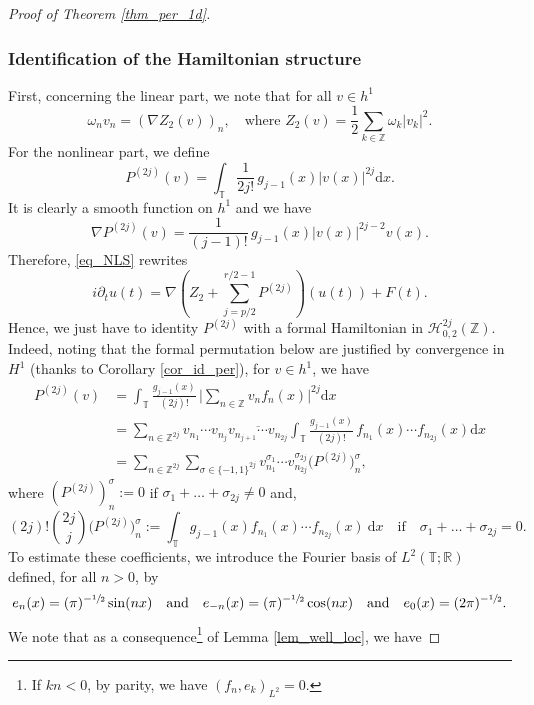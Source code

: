 \begin{proof}[Proof of Theorem \ref{thm_per_1d}]
\subsubsection*{Identification of the Hamiltonian structure}
First, concerning the linear part, we note that for all $v\in h^1$
\[
\omega_n v_n = (\nabla Z_2(v))_n,\quad \text{where } Z_2(v) = \frac12 \sum_{k\in \mathbb{Z}} \omega_k |v_k|^2.
\]
For the nonlinear part, we define
\[
P^{(2j)}(v)= \int_{\mathbb{T}} \frac1{2j!}\, g_{j-1}(x) |v(x)|^{2j} \mathrm{d}x.
\]
It is clearly a smooth function on $h^1$ and we have
\[
\nabla P^{(2j)}(v) = \frac1{(j-1)!}\, g_{j-1}(x) |v(x)|^{2j-2} v(x).
\]
Therefore, \eqref{eq_NLS} rewrites
\begin{equation}
\label{raclette_a_la_chevre}
i\partial_t u(t) = \nabla(Z_2 + \sum_{j=p/2}^{r/2-1} P^{(2j)})(u(t)) + F(t).
\end{equation}
Hence, we just have to identity $P^{(2j)}$ with a formal Hamiltonian in $\mathscr{H}_{0,2}^{2j}(\mathbb{Z})$. Indeed, noting that the formal permutation below are justified by convergence in $H^1$ (thanks to Corollary \ref{cor_id_per}), for $v\in h^1$, we have
\begin{equation*}
\begin{split}
\!\!\!\!\!\! P^{(2j)}(v) &= \int_{\mathbb{T}} \frac{g_{j-1}(x)}{(2j)!}\, \Big| \sum_{n \in \mathbb{Z}} v_n f_n(x) \Big|^{2j} \mathrm{d}x \\
&=\sum_{n \in \mathbb{Z}^{2j}} v_{n_1}\cdots v_{n_{j}} \overline{v_{n_{j+1}} \cdots v_{n_{2j}}} \int_{\mathbb{T}} \frac{g_{j-1}(x)}{(2j)!}\, f_{n_1}(x) \cdots f_{n_{2j}}(x) \mathrm{d}x \\
&= \sum_{n \in \mathbb{Z}^{2j}} \sum_{\sigma \in \{-1,1\}^{2j}} v_{n_1}^{\sigma_1}\cdots v_{n_{2j}}^{\sigma_{2j}} \bigl(P^{(2j)}\bigr)_n^\sigma,
\end{split}
\end{equation*}
where $(P^{(2j)})_n^\sigma:= 0$ if $\sigma_1+\dots+ \sigma_{2j}\neq 0$ and,
\[
(2j)! \binom{2j}{j} \bigl(P^{(2j)}\bigr)_n^\sigma:= \int_{\mathbb{T}} g_{j-1}(x) f_{n_1}(x) \cdots f_{n_{2j}}(x) \ \mathrm{d}x \quad \mathrm{if} \quad \sigma_1+\dots+ \sigma_{2j} = 0.
\]
To estimate these coefficients, we introduce the Fourier basis of $L^2(\mathbb{T};\mathbb{R})$ defined, for all $n>0$, by
\[
e_n(x)=(\pi)^{-\sfrac12}\sin(n x) \quad \text{and}\quad e_{-n}(x)=(\pi)^{-\sfrac12}\cos(n x) \quad \text{and}\quad e_0(x)=(2\pi)^{-\sfrac12}.
\]
We note that as a consequence\footnote{If $kn<0$, by parity, we have $(f_n,e_k)_{L^2}=0$.} of Lemma \ref{lem_well_loc}, we have

\end{proof}
